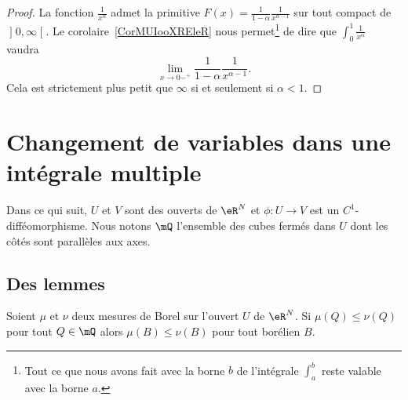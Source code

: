 \begin{proof}
La fonction \( \frac{1}{ x^{\alpha} }\) admet la primitive \( F(x)=\frac{1}{ 1-\alpha }\frac{1}{ x^{\alpha-1} }\) sur tout compact de \( \mathopen] 0 , \infty \mathclose[\). Le corolaire~\ref{CorMUIooXREleR} nous permet\footnote{Tout ce que nous avons fait avec la borne \( b\) de l'intégrale \( \int_a^b\) reste valable avec la borne \( a\).} de dire que \( \int_0^1\frac{1}{ x^{\alpha} }\) vaudra
    \begin{equation}
        \lim_{x\to 0-^+} \frac{1}{ 1-\alpha }\frac{1}{ x^{\alpha-1} }.
    \end{equation}
    Cela est strictement plus petit que \( \infty\) si et seulement si \( \alpha<1\).
\end{proof}

\section{Changement de variables dans une intégrale multiple}

Dans ce qui suit, \( U\) et \( V\) sont des ouverts de \( \eR^N\) et \( \phi\colon U\to V\) est un \( C^1\)-difféomorphisme. Nous notons \( \mQ\) l'ensemble des cubes fermés dans \( U\) dont les côtés sont parallèles aux axes.

\subsection{Des lemmes}

\begin{lemma}      \label{LemooJYCGooIkkDVn}
    Soient \( \mu\) et \( \nu\) deux mesures de Borel sur l'ouvert \( U\) de \( \eR^N\). Si \( \mu(Q)\leq \nu(Q)\) pour tout \( Q\in \mQ\) alors \( \mu(B)\leq \nu(B)\) pour tout borélien \( B\).
\end{lemma}

